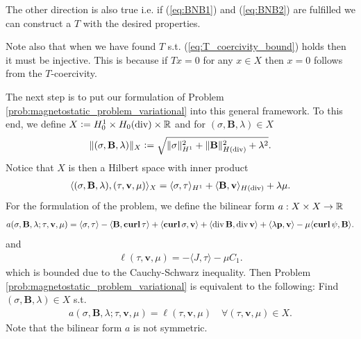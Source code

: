 \documentclass[../master_thesis.tex]{subfiles}
\begin{document}
\begin{remark}
    The other direction is also true i.e. if (\ref{eq:BNB1}) and (\ref{eq:BNB2}) 
    are fulfilled we can construct a $T$ with the desired properties.
\end{remark}

Note also that when we have found $T$ s.t. (\ref{eq:T_coercivity_bound}) holds 
then it must be injective. This is because if $Tx = 0$ for any 
$x \in X$ then $x=0$ follows from the $T$-coercivity.

The next step is to put our formulation of
Problem \ref{prob:magnetostatic_problem_variational} into 
this general framework. To this end, 
we define $X \vcentcolon= H^1_0 \times H_0(\operatorname{div}) \times \mathbb{R}$
and for $(\sigma, \mathbf{B},\lambda) \in X$
\begin{align*}
    \lVert (\sigma, \mathbf{B}, \lambda) \rVert _X 
    \vcentcolon= \sqrt{\lVert \sigma \rVert^2_{H^1} + \lVert \mathbf{B} \rVert^2_{H(\operatorname{div})}
    + \lambda^2}.
\end{align*}
Notice that $X$ is then a Hilbert space with inner product 
\begin{align*}
    \langle (\sigma,\mathbf{B},\lambda), (\tau, \mathbf{v},\mu) \rangle _X 
    = \langle \sigma, \tau \rangle _{H^1} + \langle \mathbf{B}, \mathbf{v} \rangle _{H(\operatorname{div})} + \lambda \mu.
\end{align*}
For the formulation of the problem, we define the
bilinear form $a:X\times X \rightarrow \mathbb{R}$
\begin{align}
    a(\sigma,\mathbf{B}, \lambda;\tau,\mathbf{v},\mu) 
    =   \langle \sigma, \tau \rangle - \langle \mathbf{B}, \veccurl\tau \rangle
        + \langle \veccurl\sigma, \mathbf{v} \rangle + \langle \diver \mathbf{B}, \diver \mathbf{v} \rangle 
        + \langle \lambda \mathbf{p}, \mathbf{v} \rangle - \mu \langle \veccurl \psi, \mathbf{B} \rangle.
        \label{eq:definition_bilinear_form}
\end{align}
and 
\begin{align*}
    \ell(\tau,\mathbf{v},\mu) = -\langle J, \tau \rangle - \mu C_1.
\end{align*}
which is bounded due to the Cauchy-Schwarz inequality.
Then Problem\,\ref{prob:magnetostatic_problem_variational}
is equivalent to the following: Find $(\sigma,\mathbf{B},\lambda) \in 
X$ s.t.
\begin{align*}
    a(\sigma,\mathbf{B},\lambda;\tau,\mathbf{v},\mu) = \ell(\tau,\mathbf{v},\mu)
        \quad \forall (\tau,\mathbf{v},\mu) \in X.
\end{align*}
Note that the bilinear form $a$ is not symmetric. 
\end{document}
